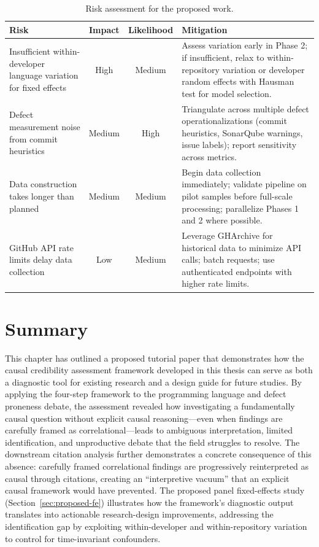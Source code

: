 \begin{table}
\centering
\footnotesize
\caption{Risk assessment for the proposed work.}
\label{tab:risk-assessment}
\begin{tabular}{p{4cm}ccp{8cm}}
\toprule
\textbf{Risk} & \textbf{Impact} & \textbf{Likelihood} & \textbf{Mitigation} \\
\midrule
Insufficient within-developer language variation for fixed effects & High & Medium & Assess variation early in Phase 2; if insufficient, relax to within-repository variation or developer random effects with Hausman test for model selection. \\
\addlinespace
Defect measurement noise from commit heuristics & Medium & High & Triangulate across multiple defect operationalizations (commit heuristics, SonarQube warnings, issue labels); report sensitivity across metrics. \\
\addlinespace
Data construction takes longer than planned & Medium & Medium & Begin data collection immediately; validate pipeline on pilot samples before full-scale processing; parallelize Phases 1 and 2 where possible. \\
\addlinespace
GitHub API rate limits delay data collection & Low & Medium & Leverage GHArchive for historical data to minimize API calls; batch requests; use authenticated endpoints with higher rate limits. \\
\bottomrule
\end{tabular}
\end{table}

\section{Summary}

This chapter has outlined a proposed tutorial paper that demonstrates how the causal credibility assessment framework developed in this thesis can serve as both a diagnostic tool for existing research and a design guide for future studies.
By applying the four-step framework to the programming language and defect proneness debate, the assessment revealed how investigating a fundamentally causal question without explicit causal reasoning---even when findings are carefully framed as correlational---leads to ambiguous interpretation, limited identification, and unproductive debate that the field struggles to resolve.
The downstream citation analysis further demonstrates a concrete consequence of this absence: carefully framed correlational findings are progressively reinterpreted as causal through citations, creating an ``interpretive vacuum'' that an explicit causal framework would have prevented.
The proposed panel fixed-effects study (Section~\ref{sec:proposed-fe}) illustrates how the framework's diagnostic output translates into actionable research-design improvements, addressing the identification gap by exploiting within-developer and within-repository variation to control for time-invariant confounders.

